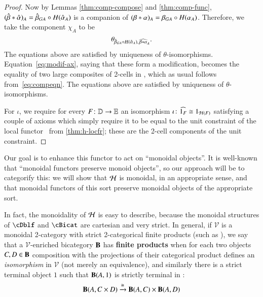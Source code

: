 \begin{proof}
  Now by Lemmas \ref{thm:comp-compose} and
  \ref{thm:comp-func}, $(\hat{\beta} *\hat{\alpha})_A = \hat{\beta}_{GA} \circ
  H(\hat{\alpha}_A)$ is a companion of $(\beta*\alpha)_A = \beta_{GA} \circ
  H(\alpha_A)$.  Therefore, we take the component $\chi_A$ to be
  \[\theta_{\hat{\beta}_{GA} \circ H(\hat{\alpha}_A),\, \widehat{\beta*\alpha}_A}.\]
  The equations above are satisfied by uniqueness of $\theta$-isomorphisms.
   Equation~\eqref{eq:modif-ax}, saying that these form a modification,
  becomes the equality of two large composites of 2-cells in \lD,
  which as usual follows from~\eqref{eq:compeqn}. The equations above are satisfied by uniqueness of $\theta$-isomorphisms.

  For $\iota$, we require for every $F\colon \mathbb{D}\to\mathbb{E}$ an isomorphism  $\iota\colon \widehat{1_F} \cong 1_{\mathcal{H}(F)}$ satisfying a couple of
  axioms which simply require it to be equal to the unit constraint of
  the local functor \cH\ from \autoref{thm:h-locfr}; these are the
  2-cell components of the unit constraint.  %
\end{proof}

Our goal is to enhance this functor to act on ``monoidal objects''.
It is well-known that ``monoidal functors preserve monoid objects'', so our approach will be to categorify this: we will show that $\mathcal{H}$ is monoidal, in an appropriate sense, and that monoidal functors of this sort preserve monoidal objects of the appropriate sort.

In fact, the monoidality of $\mathcal{H}$ is easy to describe, because the monoidal structures of $\cDblf$ and $\cBicat$ are cartesian and very strict.
In general, if $\mathcal{V}$ is a monoidal 2-category with strict 2-categorical finite products (such as \Icon), we say that a $\mathcal{V}$-enriched bicategory ${\bf B}$ has \textbf{finite products} when for each two objects $C,D \in {\bf B}$ composition with the projections of their categorical product defines an \emph{isomorphism} in $\mathcal{V}$ (not merely an equivalence), and similarly there is a strict terminal object $1$ such that $\mathbf{B}(A,1)$ is strictly terminal in \cV:
%
\begin{align}
{\bf B}(A, C \times D) \xrightarrow{\cong} {\bf B}(A,C) \times {\bf B}(A,D)
\end{align}

